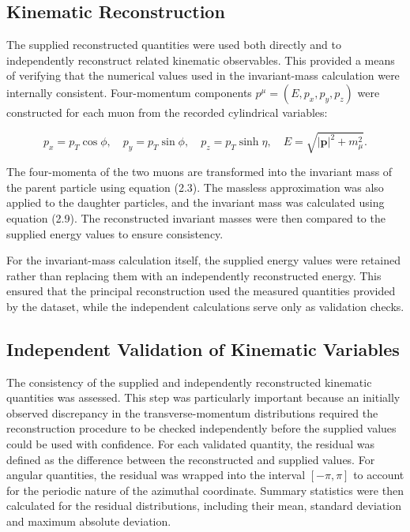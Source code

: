 \documentclass[11pt, a4paper]{article}
\numberwithin{equation}{section}
\begin{document}
\FloatBarrier
\subsection{Kinematic Reconstruction}
The supplied reconstructed quantities were used both directly and to independently reconstruct related kinematic observables. This provided a means of verifying that the numerical values used in the invariant-mass calculation were internally consistent. Four-momentum components $p^\mu = (E, p_x, p_y, p_z)$ were constructed for each muon from the recorded cylindrical variables:

\begin{equation}
p_x = p_T \cos\phi, \quad p_y = p_T \sin\phi, \quad p_z = p_T \sinh\eta, \quad E = \sqrt{|\mathbf{p}|^2 + m_\mu^2}.
\end{equation}

The four-momenta of the two muons are transformed into the invariant mass of the parent particle using equation (2.3). The massless approximation was also applied to the daughter particles, and the invariant mass was calculated using equation (2.9). The reconstructed invariant masses were then compared to the supplied energy values to ensure consistency.

For the invariant-mass calculation itself, the supplied energy values were retained rather than replacing them with an independently reconstructed energy. This ensured that the principal reconstruction used the measured quantities provided by the dataset, while the independent calculations serve only as validation checks.

\subsection{Independent Validation of Kinematic Variables}

The consistency of the supplied and independently reconstructed kinematic quantities was assessed. This step was particularly important because an initially observed discrepancy in the transverse-momentum distributions required the reconstruction procedure to be checked independently before the supplied values could be used with confidence. For each validated quantity, the residual was defined as the difference between the reconstructed and supplied values. For angular quantities, the residual was wrapped into the interval $[-\pi,\pi]$ to account for the periodic nature of the azimuthal coordinate. Summary statistics were then calculated for the residual distributions, including their mean, standard deviation and maximum absolute deviation.
\end{document}
